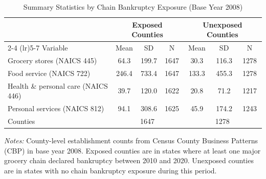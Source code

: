\begin{table}[htbp]
\centering
\caption{Summary Statistics by Chain Bankruptcy Exposure (Base Year 2008)}
\label{tab:summary}
\small
\begin{tabular}{lcccccc}
\hline\hline
 & \multicolumn{3}{c}{Exposed Counties} & \multicolumn{3}{c}{Unexposed Counties} \\
\cmidrule(lr){2-4} \cmidrule(lr){5-7}
Variable & Mean & SD & N & Mean & SD & N \\
\hline
Grocery stores (NAICS 445) & 64.3 & 199.7 & 1647 & 30.3 & 116.3 & 1278 \\
Food service (NAICS 722) & 246.4 & 733.4 & 1647 & 133.3 & 455.3 & 1278 \\
Health \& personal care (NAICS 446) & 39.7 & 120.0 & 1622 & 20.8 & 71.2 & 1217 \\
Personal services (NAICS 812) & 94.1 & 308.6 & 1625 & 45.9 & 174.2 & 1243 \\
\hline
Counties & \multicolumn{3}{c}{1647} & \multicolumn{3}{c}{1278} \\
\hline\hline
\end{tabular}
\begin{tablenotes}
\item \textit{Notes:} County-level establishment counts from Census County Business Patterns (CBP) in base year 2008. Exposed counties are in states where at least one major grocery chain declared bankruptcy between 2010 and 2020. Unexposed counties are in states with no chain bankruptcy exposure during this period.
\end{tablenotes}
\end{table}
